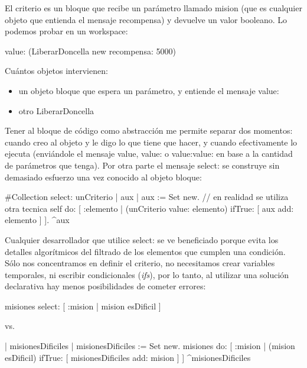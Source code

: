 \documentclass[a4paper,12pt]{book}
\begin{document}
\vspace{\baselineskip}
El criterio es un bloque que recibe un parámetro llamado mision (que es cualquier objeto que entienda el mensaje
recompensa) y devuelve un valor booleano. Lo podemos probar en un workspace:

\begin{code}
     value: (LiberarDoncella new recompensa: 5000)
\end{code}

\vspace{\baselineskip}
Cuántos objetos intervienen:

\begin{itemize}
 \item un objeto bloque que espera un parámetro, y entiende el mensaje value:
 \item otro LiberarDoncella
\end{itemize}

Tener al bloque de código como abstracción me permite separar dos momentos: cuando creo al objeto y le digo lo
que tiene que hacer, y cuando efectivamente lo ejecuta (enviándole el mensaje value, value: o value:value: en
base a la cantidad de parámetros que tenga). Por otra parte el mensaje select: se construye sin demasiado esfuerzo
una vez conocido al objeto bloque:

\begin{code}
#Collection
select: unCriterio
    | aux |
    aux := Set new.  // en realidad se utiliza otra tecnica
    self do: [ :elemento | 
         (unCriterio value: elemento) 
               ifTrue: [ aux add: elemento ] 
         ].
    ^aux
\end{code}

\vspace{\baselineskip}
Cualquier desarrollador que utilice select: se ve beneficiado porque evita los detalles algorítmicos del filtrado
de los elementos que cumplen una condición. Sólo nos concentramos en definir el criterio, no necesitamos crear
variables temporales, ni escribir condicionales (\textit{ifs}), por lo tanto, al utilizar una solución declarativa
hay menos posibilidades de cometer errores:

\begin{code}
misiones select: [ :mision | mision esDificil ]
\end{code}

vs.

\begin{code}
| misionesDificiles |
misionesDificiles := Set new.
misiones do: 
    [ :mision | (mision esDificil)
                        ifTrue: [ misionesDificiles add: mision ]
    ]
^misionesDificiles    
\end{code}
\end{document}
